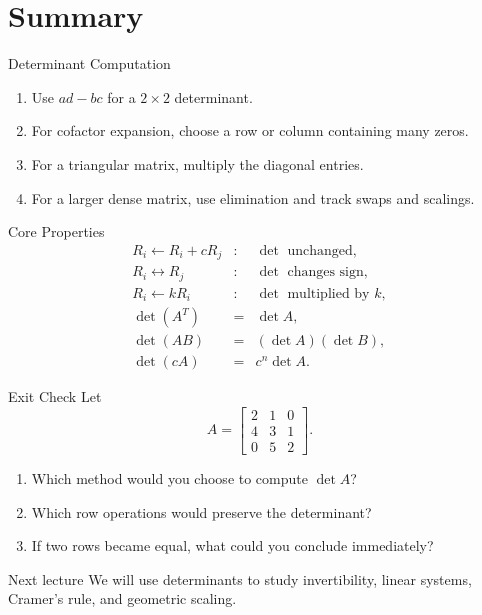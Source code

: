 \section[Summary]{Summary}

\begin{frame}{Determinant Computation}
\begin{enumerate}
  \item Use $ad-bc$ for a $2\times2$ determinant.
  \item For cofactor expansion, choose a row or column containing many zeros.
  \item For a triangular matrix, multiply the diagonal entries.
  \item For a larger dense matrix, use elimination and track swaps and scalings.
\end{enumerate}
\end{frame}

\begin{frame}{Core Properties}
\[
\begin{array}{rcl}
R_i\leftarrow R_i+cR_j &:& \det\text{ unchanged},\\[.5ex]
R_i\leftrightarrow R_j &:& \det\text{ changes sign},\\[.5ex]
R_i\leftarrow kR_i &:& \det\text{ multiplied by }k,\\[.5ex]
\det(A^T)&=&\det A,\\[.5ex]
\det(AB)&=&(\det A)(\det B),\\[.5ex]
\det(cA)&=&c^n\det A.
\end{array}
\]
\end{frame}

\begin{frame}{Exit Check}
Let
\[
A=\begin{bmatrix}
2&1&0\\
4&3&1\\
0&5&2
\end{bmatrix}.
\]
\begin{enumerate}
  \item Which method would you choose to compute $\det A$?
  \item Which row operations would preserve the determinant?
  \item If two rows became equal, what could you conclude immediately?
\end{enumerate}
\pause
\begin{block}{Next lecture}
We will use determinants to study invertibility, linear systems, Cramer's rule, and geometric scaling.
\end{block}
\end{frame}

